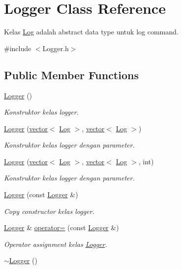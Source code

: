 \hypertarget{class_logger}{}\section{Logger Class Reference}
\label{class_logger}


Kelas \hyperlink{class_log}{Log} adalah abstract data type untuk log command.  




{\ttfamily \#include $<$Logger.\+h$>$}

\subsection*{Public Member Functions}
\begin{DoxyCompactItemize}
\item 
\hypertarget{class_logger_abc41bfb031d896170c7675fa96a6b30c}{}\hyperlink{class_logger_abc41bfb031d896170c7675fa96a6b30c}{Logger} ()\label{class_logger_abc41bfb031d896170c7675fa96a6b30c}

\begin{DoxyCompactList}\small\item\em Konstruktor kelas logger. \end{DoxyCompactList}\item 
\hyperlink{class_logger_a8272fd5aa9d2cfd23c0a785efb84e5aa}{Logger} (\hyperlink{classvector}{vector}$<$ \hyperlink{class_log}{Log} $>$, \hyperlink{classvector}{vector}$<$ \hyperlink{class_log}{Log} $>$)
\begin{DoxyCompactList}\small\item\em Konstruktor kelas logger dengan parameter. \end{DoxyCompactList}\item 
\hyperlink{class_logger_a6d00ba1af86d2af7f048023137df724a}{Logger} (\hyperlink{classvector}{vector}$<$ \hyperlink{class_log}{Log} $>$, \hyperlink{classvector}{vector}$<$ \hyperlink{class_log}{Log} $>$, int)
\begin{DoxyCompactList}\small\item\em Konstruktor kelas logger dengan parameter. \end{DoxyCompactList}\item 
\hyperlink{class_logger_ad1dc4093a3d8c26802357fe2bdb1dabf}{Logger} (const \hyperlink{class_logger}{Logger} \&)
\begin{DoxyCompactList}\small\item\em Copy constructor kelas logger. \end{DoxyCompactList}\item 
\hyperlink{class_logger}{Logger} \& \hyperlink{class_logger_a405b93221b9f3c4293447ed1bf4b77d2}{operator=} (const \hyperlink{class_logger}{Logger} \&)
\begin{DoxyCompactList}\small\item\em Operator assignment kelas \hyperlink{class_logger}{Logger}. \end{DoxyCompactList}\item 
\hypertarget{class_logger_acb668a9e186a25fbaad2e4af6d1ed00a}{}\hyperlink{class_logger_acb668a9e186a25fbaad2e4af6d1ed00a}{$\sim$\+Logger} ()\label{class_logger_acb668a9e186a25fbaad2e4af6d1ed00a}


\end{DoxyCompactItemize}
